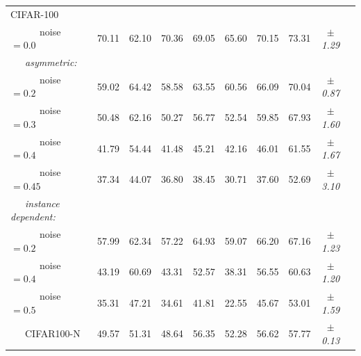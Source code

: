 \documentclass[11pt]{article}
\begin{document}
\begin{table}[htbp]
{\begin{tabular}{lccccccccc}
CIFAR-100\\
~~~~~~noise $=0.0$ & 70.11 & 62.10& 70.36&69.05& 65.60& 70.15 & 73.31 &$\pm$\textit{1.29}\\[1mm]
~~~\textit{asymmetric:}\\
~~~~~~noise $=0.2$ & 59.02 & 64.42 & 58.58& 63.55 & 60.56  & 66.09 & 70.04 & $\pm$\textit{0.87}\\
~~~~~~noise $=0.3$ & 50.48 & 62.16 & 50.27 & 56.77& 52.54 & 59.85 & 67.93 & $\pm$\textit{1.60}\\
~~~~~~noise $=0.4$ &41.79 & 54.44 & 41.48 & 45.21& 42.16 & 46.01 & 61.55 &$\pm$\textit{1.67}\\
~~~~~~noise $=0.45$ & 37.34 & 44.07 & 36.80 & 38.45 & 30.71 & 37.60 & 52.69 &$\pm$\textit{3.10}\\[1mm]
~~~\textit{instance dependent:}\\
~~~~~~noise $=0.2$ & 57.99 & 62.34 & 57.22 & 64.93 & 59.07 & 66.20 &67.16 &$\pm$\textit{1.23}\\
~~~~~~noise $=0.4$ & 43.19 & 60.69 & 43.31 & 52.57 & 38.31 & 56.55 & 60.63 &$\pm$\textit{1.20}\\
~~~~~~noise $=0.5$ & 35.31 & 47.21 & 34.61 & 41.81 & 22.55 & 45.67 &53.01 &$\pm$\textit{1.59}\\
~~~CIFAR100-N & 49.57 & 51.31 & 48.64 & 56.35 & 52.28 & 56.62 & 57.77 &$\pm$\textit{0.13}\\
\bottomrule
\end{tabular}
}
\end{table}
\end{document}

